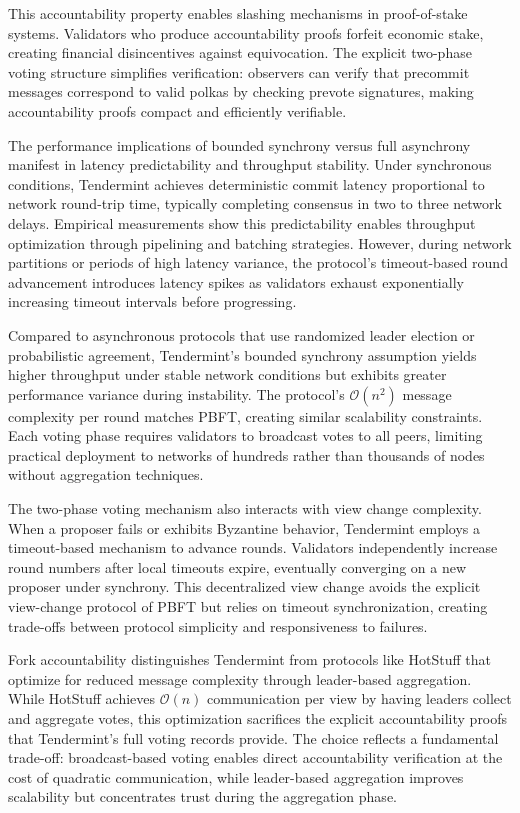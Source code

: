 This accountability property enables slashing mechanisms in proof-of-stake systems. Validators who produce accountability proofs forfeit economic stake, creating financial disincentives against equivocation. The explicit two-phase voting structure simplifies verification: observers can verify that precommit messages correspond to valid polkas by checking prevote signatures, making accountability proofs compact and efficiently verifiable.

The performance implications of bounded synchrony versus full asynchrony manifest in latency predictability and throughput stability. Under synchronous conditions, Tendermint achieves deterministic commit latency proportional to network round-trip time, typically completing consensus in two to three network delays. Empirical measurements show this predictability enables throughput optimization through pipelining and batching strategies. However, during network partitions or periods of high latency variance, the protocol's timeout-based round advancement introduces latency spikes as validators exhaust exponentially increasing timeout intervals before progressing.

Compared to asynchronous protocols that use randomized leader election or probabilistic agreement, Tendermint's bounded synchrony assumption yields higher throughput under stable network conditions but exhibits greater performance variance during instability. The protocol's $\mathcal{O}(n^2)$ message complexity per round matches PBFT, creating similar scalability constraints. Each voting phase requires validators to broadcast votes to all peers, limiting practical deployment to networks of hundreds rather than thousands of nodes without aggregation techniques.

The two-phase voting mechanism also interacts with view change complexity. When a proposer fails or exhibits Byzantine behavior, Tendermint employs a timeout-based mechanism to advance rounds. Validators independently increase round numbers after local timeouts expire, eventually converging on a new proposer under synchrony. This decentralized view change avoids the explicit view-change protocol of PBFT but relies on timeout synchronization, creating trade-offs between protocol simplicity and responsiveness to failures.

Fork accountability distinguishes Tendermint from protocols like HotStuff that optimize for reduced message complexity through leader-based aggregation. While HotStuff achieves $\mathcal{O}(n)$ communication per view by having leaders collect and aggregate votes, this optimization sacrifices the explicit accountability proofs that Tendermint's full voting records provide. The choice reflects a fundamental trade-off: broadcast-based voting enables direct accountability verification at the cost of quadratic communication, while leader-based aggregation improves scalability but concentrates trust during the aggregation phase.

